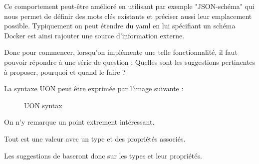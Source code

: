 \documentclass[
    iict, %
    il, %
]{heig-tb}
\begin{document}
Ce comportement peut-être amélioré en utilisant par exemple "JSON-schéma" qui nous permet de définir des mots clés existants et préciser aussi leur emplacement possible.
Typiquement on peut étendre du yaml en lui spécifiant un schéma Docker est ainsi rajouter une source d'information externe.

Donc pour commencer, lorsqu'on implémente une telle fonctionnalité, il faut pouvoir répondre à une série de question :
Quelles sont les suggestions pertinentes à proposer, pourquoi et quand le faire ?

La syntaxe UON peut être exprimée par l'image suivante :

\begin{figure}[!ht]
    \begin{center}
    \end{center}
    \caption[syntax]{\label{syntax} UON syntax}
\end{figure}

On n'y remarque un point extrement intéressant.

Tout est une valeur avec un type et des propriétés associés.

Les suggestions de baseront donc sur les types et leur propriétés.






\end{document}

